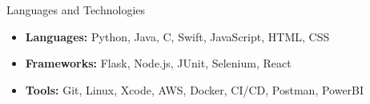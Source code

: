 \documentclass[]{mcdowellcv}
\begin{document}
	\begin{cvsection}{Languages and Technologies}
		\begin{cvsubsection}{}{}{}
			\begin{itemize}
				\item \textbf{Languages:} Python, Java, C, Swift, JavaScript, HTML, CSS
				\item \textbf{Frameworks:} Flask, Node.js, JUnit, Selenium, React
				\item \textbf{Tools:}  Git, Linux, Xcode, AWS, Docker, CI/CD, Postman, PowerBI
			\end{itemize}
		\end{cvsubsection}
	\end{cvsection}
	
\end{document}

